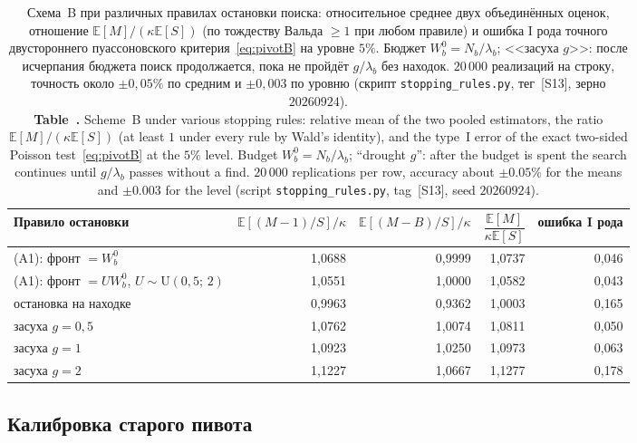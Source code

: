 \documentclass[11pt,a4paper]{article}
\newcommand{\encaptab}[1]{\\[3pt]\foreignlanguage{english}{%
  \textbf{Table~\thetable.} #1}}
\theoremstyle{plain}
\theoremstyle{remark}
\begin{document}
\begin{table}[t]
\centering
\caption{Схема~B при различных правилах остановки поиска: относительное среднее
двух объединённых оценок, отношение $\mathbb E[M]/(\kappa\mathbb E[S])$ (по тождеству
Вальда $\ge1$ при любом правиле) и ошибка I рода точного двустороннего
пуассоновского критерия~\eqref{eq:pivotB} на уровне $5\%$. Бюджет
$W^0_b=N_b/\lambda_b$; <<засуха $g$>>: после исчерпания бюджета поиск
продолжается, пока не пройдёт $g/\lambda_b$ без находок. $20\,000$ реализаций на
строку, точность около $\pm0{,}05\%$ по средним и $\pm0{,}003$ по уровню (скрипт
\texttt{stopping\_rules.py}, тег~[S13], зерно $20260924$).
\encaptab{Scheme~B under various stopping rules: relative mean of the two pooled
estimators, the ratio $\mathbb E[M]/(\kappa\mathbb E[S])$ (at least $1$ under every
rule by Wald's identity), and the type~I error of the exact two-sided Poisson
test~\eqref{eq:pivotB} at the $5\%$ level. Budget $W^0_b=N_b/\lambda_b$;
``drought $g$'': after the budget is spent the search continues until
$g/\lambda_b$ passes without a find. $20\,000$ replications per row, accuracy
about $\pm0.05\%$ for the means and $\pm0.003$ for the level (script
\texttt{stopping\_rules.py}, tag~[S13], seed $20260924$).}}
\label{tab:stop}
\small
\begin{tabular}{lrrrr}
\toprule
Правило остановки & $\mathbb E[(M{-}1)/S]/\kappa$ & $\mathbb E[(M{-}B)/S]/\kappa$
& $\dfrac{\mathbb E[M]}{\kappa\mathbb E[S]}$ & ошибка I рода\\
\midrule
(A1): фронт $=W^0_b$ & 1{,}0688 & 0{,}9999 & 1{,}0737 & 0{,}046\\
(A1): фронт $=UW^0_b$, $U\sim\mathrm U(0{,}5;\,2)$ & 1{,}0551 & 1{,}0000 & 1{,}0582 & 0{,}043\\
остановка на находке & 0{,}9963 & 0{,}9362 & 1{,}0003 & 0{,}165\\
засуха $g=0{,}5$ & 1{,}0762 & 1{,}0074 & 1{,}0811 & 0{,}050\\
засуха $g=1$ & 1{,}0923 & 1{,}0250 & 1{,}0973 & 0{,}063\\
засуха $g=2$ & 1{,}1227 & 1{,}0667 & 1{,}1277 & 0{,}178\\
\bottomrule
\end{tabular}
\end{table}

\subsection{Калибровка старого пивота}\label{sec:calib}
\end{document}
